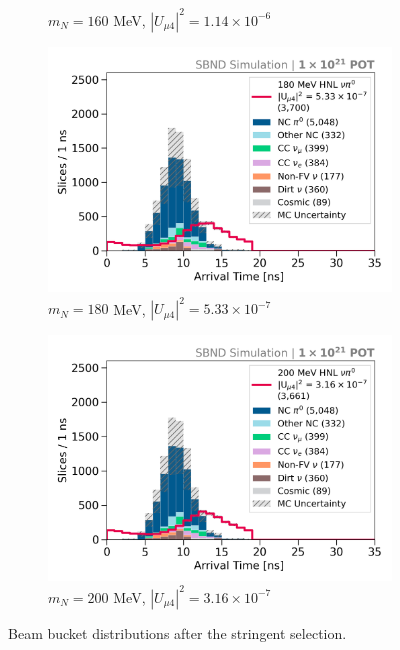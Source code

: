 \begin{figure}[hb!]
\begin{subfigure}[b]{0.495\textwidth}
            \caption{$m_N = 160$ MeV, $|U_{\mu4}|^2 = 1.14 \times 10^{-6}$ }
        \end{subfigure}
        \begin{subfigure}[b]{0.495\textwidth}
            \includegraphics[width=\textwidth]{m180}
            \caption{$m_N = 180$ MeV, $|U_{\mu4}|^2 = 5.33 \times 10^{-7}$ }
        \end{subfigure}
        \begin{subfigure}[b]{0.495\textwidth}
            \includegraphics[width=\textwidth]{m200}
            \caption{$m_N = 200$ MeV, $|U_{\mu4}|^2 = 3.16 \times 10^{-7}$ }
        \end{subfigure}
        \caption[Stringent Beam Bucket Distributions in the Mass Range 140 - 200 MeV]{
	Beam bucket distributions after the stringent selection.
	}
\end{figure}

